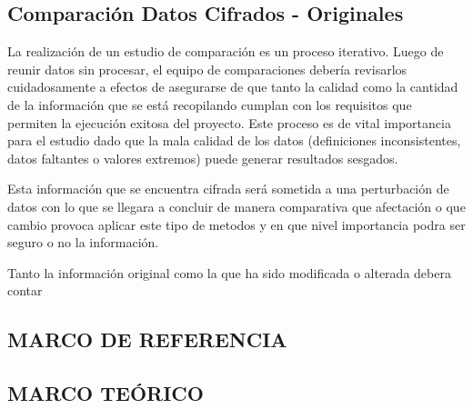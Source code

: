 \documentclass[a4paper,openright,12pt]{book}
\theoremstyle{definition}
\theoremstyle{remark}
\begin{document}
     \section{Comparación Datos Cifrados - Originales}
La realización de un estudio de comparación es un proceso iterativo. Luego de reunir datos sin procesar, el equipo de comparaciones debería revisarlos cuidadosamente a efectos de asegurarse de que tanto la calidad como la cantidad de la información que se está recopilando cumplan con los requisitos que permiten la ejecución exitosa del proyecto. Este proceso es de vital importancia para el estudio dado que la mala calidad de los datos (definiciones inconsistentes, datos faltantes o valores extremos) puede generar resultados sesgados.


Esta información que se encuentra cifrada será sometida a una perturbación de datos con lo que se llegara a concluir de manera comparativa que afectación o que cambio provoca aplicar este tipo de metodos y en que nivel importancia podra ser seguro o no la información.

Tanto la información original como la que ha sido  modificada o alterada debera contar 
\begin{center}
 \chapter{MARCO DE REFERENCIA}\label{cap.referencia}
\end{center}

\section{MARCO TEÓRICO}
\end{document}
